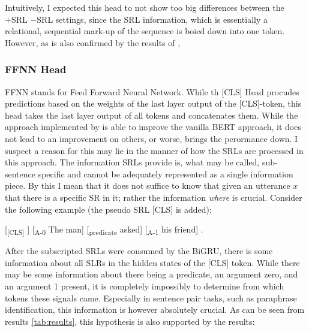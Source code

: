 Intuitively, I expected this head to not show too big differences between the +SRL $-$SRL settings,
since the SRL information, which is essentially a relational, sequential mark-up of the sequence is
boied down into one token. However, as is also confirmed by the results of \cite{zhang2019semantics},


\subsubsection{FFNN Head}

FFNN stands for Feed Forward Neural Network. While th [CLS] Head procudes predictions based on the
weights of the last layer output of the [CLS]-token, this head takes the last layer output of all
tokens and concatenates them.
While the approach implemented by \cite{zhang2019semantics} is able to improve the vanilla
BERT approach, it does not lead to an improvement on others, or worse, brings the perormance
down. I suspect a reason for this may lie in the manner of how the SRLs are processed in this
approach. The information SRLs provide is, what may be called, sub-sentence specific and
cannot be adequately represented as a single information piece. By this I mean that it does
not suffice to know that given an utterance $x$ that there is a specific SR in it; rather the
information \emph{where} is crucial. Consider the following example (the pseudo SRL [CLS] is
added):


[\textsubscript{[CLS]} ] [\textsubscript{A-0} The man] [\textsubscript{predicate} asked] [\textsubscript{A-1} his friend] .

After the subscripted SRLs were consumed by the BiGRU, there is some information about all
SLRs in the hidden states of the [CLS] token. While there may be some information about there
being a predicate, an argument zero, and an argument 1 present, it is completely impossibly
to determine from which tokens these signals came. Especially in sentence pair tasks, such
as paraphrase identification, this information is however absolutely crucial. As can be seen
from results \ref{tab:results}, this hypothesis is also supported by the results:


